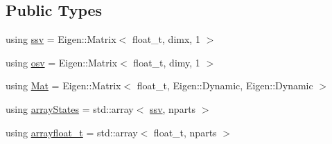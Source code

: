 \subsection*{Public Types}
\begin{DoxyCompactItemize}
\item 
using \hyperlink{classSISRFilter_ada0fdfca451ed6a22a8bba48a881819d}{ssv} = Eigen\+::\+Matrix$<$ float\+\_\+t, dimx, 1 $>$
\item 
using \hyperlink{classSISRFilter_a42325662bf3d057ccc3eaa75fa2f70f9}{osv} = Eigen\+::\+Matrix$<$ float\+\_\+t, dimy, 1 $>$
\item 
using \hyperlink{classSISRFilter_afca4a8c20de84bb2581e500954df0912}{Mat} = Eigen\+::\+Matrix$<$ float\+\_\+t, Eigen\+::\+Dynamic, Eigen\+::\+Dynamic $>$
\item 
using \hyperlink{classSISRFilter_adcfb2972e7737f4a5c5b3912bc787768}{array\+States} = std\+::array$<$ \hyperlink{classSISRFilter_ada0fdfca451ed6a22a8bba48a881819d}{ssv}, nparts $>$
\item 
using \hyperlink{classSISRFilter_abe3cebcc32e298af8bcb5651d933e76d}{arrayfloat\+\_\+t} = std\+::array$<$ float\+\_\+t, nparts $>$
\end{DoxyCompactItemize}
